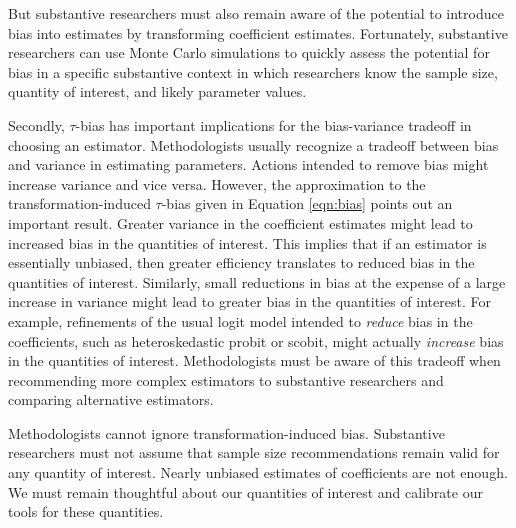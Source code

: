 \documentclass[12pt]{article}
\begin{document}
But substantive researchers must also remain aware of the potential to introduce bias into estimates by transforming coefficient estimates. 
Fortunately, substantive researchers can use Monte Carlo simulations to quickly assess the potential for bias in a specific substantive context in which researchers know the sample size, quantity of interest, and likely parameter values. 

Secondly, $\tau$-bias has important implications for the bias-variance tradeoff in choosing an estimator. 
Methodologists usually recognize a tradeoff between bias and variance in estimating parameters. 
Actions intended to remove bias might increase variance and vice versa.
However, the approximation to the transformation-induced $\tau$-bias given in Equation \ref{eqn:bias} points out an important result. 
Greater variance in the coefficient estimates might lead to increased bias in the quantities of interest. 
This implies that if an estimator is essentially unbiased, then greater efficiency translates to reduced bias in the quantities of interest. 
Similarly, small reductions in bias at the expense of a large increase in variance might lead to greater bias in the quantities of interest. 
For example, refinements of the usual logit model intended to \textit{reduce} bias in the coefficients, such as heteroskedastic probit or scobit, might actually \textit{increase} bias in the quantities of interest. 
Methodologists must be aware of this tradeoff when recommending more complex estimators to substantive researchers and comparing alternative estimators.

Methodologists cannot ignore transformation-induced bias. Substantive researchers must not assume that sample size recommendations remain valid for any quantity of interest. Nearly unbiased estimates of coefficients are not enough. We must remain thoughtful about our quantities of interest and calibrate our tools for these quantities.



\singlespace 
\small


\end{document}
